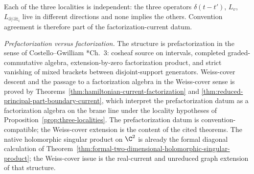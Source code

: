 Each of the three localities is independent: the three operators
\(\delta(t-t')\), \(L_v\), \(L_{\partial/\partial\bar z_i}\) live in
different directions and none implies the others.  Convention agreement
is therefore part of the factorization-current datum.

\medskip
\noindent\emph{Prefactorization versus factorization.}  The structure is
prefactorization in the sense of
Costello--Gwilliam \cite{costello-gwilliam}*{Ch.~3}: cosheaf source on
intervals, completed graded-commutative algebra, extension-by-zero
factorization product, and strict vanishing of mixed brackets between
disjoint-support generators.  Weiss-cover descent and the passage to a
factorization algebra in the Weiss-cover sense is proved by
Theorems~\ref{thm:hamiltonian-current-factorization} and
\ref{thm:reduced-principal-part-boundary-current}, which interpret the
prefactorization datum as a factorization algebra on the brane line
under the locality hypotheses of
Proposition~\ref{prop:three-localities}.  The prefactorization datum is
convention-compatible; the Weiss-cover extension is the content of the
cited theorems.  The native
holomorphic singular product on \(\C^2\) is already the formal diagonal calculation
of Theorem~\ref{thm:formal-two-dimensional-holomorphic-singular-product}; the
Weiss-cover issue is the real-current and unreduced graph extension of
that structure.

